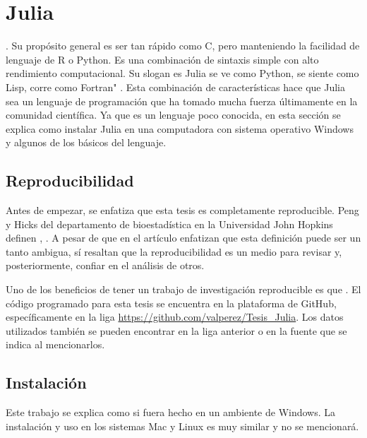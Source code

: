 \chapter{Julia}

 \cite{Hackers}.  Su propósito general es ser tan rápido como \textsf{C}, pero manteniendo la facilidad de lenguaje de \textsf{R} o \textsf{Python}. Es una combinación de sintaxis simple con alto rendimiento computacional. Su slogan es \textsf{Julia} se ve como \textsf{Python}, se siente como \textsf{Lisp}, corre como \textsf{Fortran}" \cite{Hackers}. 
Esta combinación de características hace que \textsf{Julia} sea un lenguaje de programación que ha tomado mucha fuerza últimamente en la comunidad científica. Ya que es un lenguaje poco conocida, en esta sección se explica como instalar \textsf{Julia} en una computadora con sistema operativo \textsf{Windows} y algunos de los básicos del lenguaje.

\section{Reproducibilidad}
Antes de empezar, se enfatiza que esta tesis es completamente reproducible. Peng y Hicks del departamento de bioestadística en la Universidad John Hopkins definen , \cite{peng2021reproducible}. A pesar de que en el artículo enfatizan que esta definición puede ser un tanto ambigua, sí resaltan que la reproducibilidad es un medio para revisar y, posteriormente, confiar en el análisis de otros. 

Uno de los beneficios de tener un trabajo de investigación reproducible es que  \cite{peng2021reproducible}. El código programado para esta tesis se encuentra en la plataforma de GitHub, específicamente en la liga \url{https://github.com/valperez/Tesis_Julia}. Los datos utilizados también se pueden encontrar en la liga anterior o en la fuente que se indica al mencionarlos. 

\section{Instalación}
Este trabajo se explica como si fuera hecho en un ambiente de \textsf{Windows}. La instalación y uso en los sistemas \textsf{Mac} y \textsf{Linux} es muy similar y no se mencionará.  

